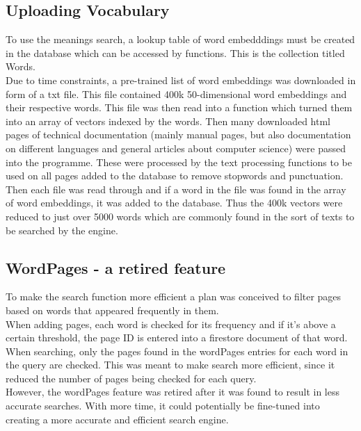 \subsection{Uploading Vocabulary}
To use the meanings search, a lookup table of word embedddings must be created in the database which can be accessed by functions. This is the collection titled Words. \\
Due to time constraints, a pre-trained list of word embeddings was downloaded in form of a txt file. This file contained 400k 50-dimensional word embeddings and their respective words. 
This file was then read into a function which turned them into an array of vectors indexed by the words. Then many downloaded html pages of technical documentation (mainly manual pages, but also documentation on different languages and general articles about computer science) were passed into the programme. These were processed by the text processing functions to be used on all pages added to the database to remove stopwords and punctuation. Then each file was read through and if a word in the file was found in the array of word embeddings, it was added to the database. Thus the 400k vectors were reduced to just over 5000 words which are commonly found in the sort of texts to be searched by the engine.    

\subsection{WordPages - a retired feature}
To make the search function more efficient a plan was conceived to filter pages based on words that appeared frequently in them. \\
When adding pages, each word is checked for its frequency and if it's above a certain threshold, the page ID is entered into a firestore document of that word. \\
When searching, only the pages found in the wordPages entries for each word in the query are checked. This was meant to make search more efficient, since it reduced the number of pages being checked for each query. \\
However, the wordPages feature was retired after it was found to result in less accurate searches. With more time, it could potentially be fine-tuned into creating a more accurate and efficient search engine. 
